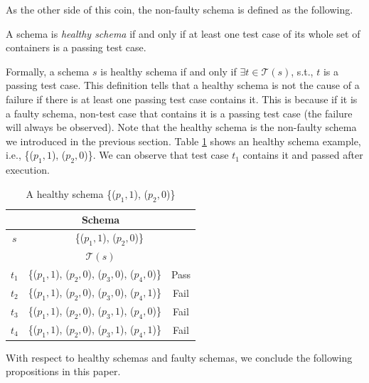 As the other side of this coin, the non-faulty schema is defined as the following.

\begin{definition}\label{de:healthy}
A schema is \emph{healthy schema} if and only if at least one test case of its whole set of containers is a passing test case.
\end{definition}

Formally, a schema $s$ is healthy schema if and only if $\exists t \in \mathcal{T}(s)$, s.t., $t$ is a passing test case. This definition tells that a healthy schema is not the cause of a failure if there is at least one passing test case contains it. This is because if it is a faulty schema, non-test case that contains it is a passing test case (the failure will always be observed). Note that the healthy schema is the non-faulty schema we introduced in the previous section.  Table \ref{ex:healthyshema} shows an healthy schema example, i.e., \{($p_{1}, 1$), ($p_{2}, 0$)\}. We can observe that test case $t_{1}$ contains it and passed after execution.


\begin{table}[htbp]
  \centering
  \caption{A healthy schema \{($p_{1}, 1$), ($p_{2}, 0$)\}}
  \label{ex:healthyshema}
    \begin{tabular}{|c|c|c|}\hline
  \multicolumn{3}{|c|}{ \textbf{Schema}} \\ \hline
   $s$ &   \multicolumn{2}{|c|}{\{($p_{1}, 1$), ($p_{2}, 0$)\} } \\ \hline
  \multicolumn{3}{|c|}{ \textbf{ $\mathcal{T}(s)$ }}\\ \hline
    $t_{1}$ &   \{($p_{1}, 1$), ($p_{2}, 0$), ($p_{3}, 0$), ($p_{4}, 0$)\} & Pass \\
    $t_{2}$ &   \{($p_{1}, 1$), ($p_{2}, 0$), ($p_{3}, 0$), ($p_{4}, 1$)\} & Fail \\
    $t_{3}$ &   \{($p_{1}, 1$), ($p_{2}, 0$), ($p_{3}, 1$), ($p_{4}, 0$)\} & Fail \\
    $t_{4}$ &   \{($p_{1}, 1$), ($p_{2}, 0$), ($p_{3}, 1$), ($p_{4}, 1$)\} & Fail \\ \hline
    \end{tabular}
\end{table}%


With respect to healthy schemas and faulty schemas, we conclude the following  propositions in this paper.


